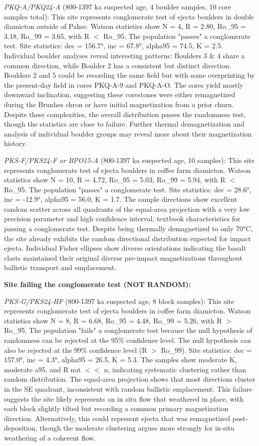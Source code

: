 \documentclass[twocolumn,11pt]{article}
\begin{document}
\textit{PKQ-A/PKQ24-A} (800-1397 ka suspected age, 4 boulder samples, 10 core samples total): This site represents conglomerate test of ejecta boulders in double diamicton outside of Pakse. Watson statistics show N = 4, R = 2.80, Ro\_95 = 3.18, Ro\_99 = 3.65, with R $<$ Ro\_95. The population "passes" a conglomerate test. Site statistics: dec = 156.7°, inc = 67.8°, alpha95 = 74.5, K = 2.5. Individual boulder analyses reveal interesting patterns: Boulders 3 \& 4 share a common direction, while Boulder 2 has a consistent but distinct direction. Boulders 2 and 5 could be recording the same field but with some overprinting by the present-day field in cores PKQ-A-9 and PKQ-A-O. The cores yield mostly downward inclination, suggesting these corestones were either remagnetized during the Brunhes chron or have initial magnetization from a prior churn. Despite these complexities, the overall distribution passes the randomness test, though the statistics are close to failure. Further thermal demagnetization and analysis of individual boulder groups may reveal more about their magnetization history.

\textit{PKS-F/PKS24-F or BPO15-A} (800-1397 ka suspected age, 10 samples): This site represents conglomerate test of ejecta boulders in coffee farm diamicton. Watson statistics show N = 10, R = 4.72, Ro\_95 = 5.03, Ro\_99 = 5.94, with R $<$ Ro\_95. The population "passes" a conglomerate test. Site statistics: dec = 28.6°, inc = -12.9°, alpha95 = 56.0, K = 1.7. The sample directions show excellent random scatter across all quadrants of the equal-area projection with a very low precision parameter and high confidence interval, textbook characteristics for passing a conglomerate test. Despite being thermally demagnetized to only 70°C, the site already exhibits the random directional distribution expected for impact ejecta. Individual Fisher ellipses show diverse orientations indicating the basalt clasts maintained their original diverse pre-impact magnetizations throughout ballistic transport and emplacement.

\textbf{Site failing the conglomerate test (NOT RANDOM):}

\textit{PKS-G/PKS24-HF} (800-1397 ka suspected age, 8 block samples): This site represents conglomerate test of ejecta boulders in coffee farm diamicton. Watson statistics show N = 8, R = 6.68, Ro\_95 = 4.48, Ro\_99 = 5.26, with R $>$ Ro\_95. The population "fails" a conglomerate test because the null hypothesis of randomness can be rejected at the 95\% confidence level. The null hypothesis can also be rejected at the 99\% confidence level (R $>$ Ro\_99). Site statistics: dec = 157.0°, inc = 4.3°, alpha95 = 26.5, K = 5.3. The samples show moderate K, moderate a95, and R not $<<$ n, indicating systematic clustering rather than random distribution. The equal-area projection shows that most directions cluster in the SE quadrant, inconsistent with random ballistic emplacement. This failure suggests the site likely represents an in situ flow that weathered in place, with each block slightly tilted but recording a common primary magnetization direction. Alternatively, this could represent ejecta that was remagnetized post-deposition, though the moderate clustering argues more strongly for in-situ weathering of a coherent flow.
\end{document}
